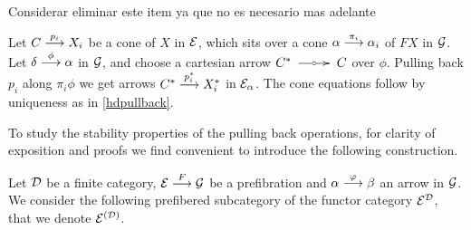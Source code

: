 \begin{sinnadastandard}
\begin{enumerate}
{\erojo  Considerar eliminar este item ya que no es necesario mas adelante}
 
Let $C \overset {p_i} {\longrightarrow} X_i$ be a cone of $X$ in $\mathcal{E}$, which sits over a cone 
$\alpha \overset {\pi_i} {\longrightarrow} \alpha_i$ of $FX$ in $\mathcal{G}$. 
Let $\delta \overset {\phi} {\longrightarrow} \alpha$ in $\mathcal{G}$, and choose a cartesian arrow 
$C^* \tocar C$ over $\phi$. Pulling back $p_i$ along $\pi_i \phi$ we get arrows 
$C^* \overset {p_i^*} {\longrightarrow} X_i^*$ in $\mathcal{E}_\alpha$.  The cone equations follow by uniqueness as in \ref{hdpullback}.
\end{enumerate}
\end{sinnadastandard}

\vspace{1ex}

To study the stability properties of the pulling back operations, for clarity of exposition and proofs we find convenient to introduce the following construction.
 
Let $\mathcal{D}$ be a finite category, 
$\mathcal{E} \overset {F} {\longrightarrow} \mathcal{G}$ be a prefibration and $\alpha \overset {\varphi} {\longrightarrow} \beta$ an arrow in $\mathcal{G}$. We consider the following prefibered subcategory of the functor category $\mathcal{E}^\mathcal{D}$, that we denote  $\mathcal{E}^{(\mathcal{D})}$.

